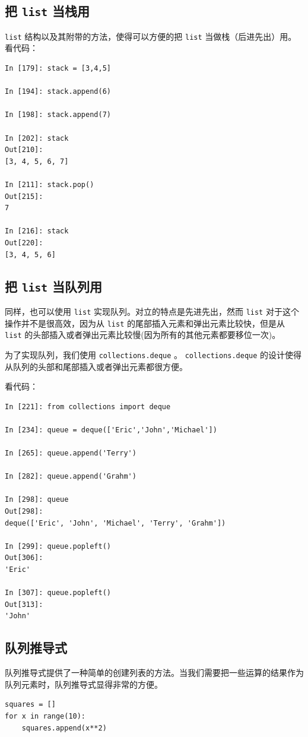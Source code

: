 \documentclass[10pt,a4paper,UTF8]{article}
\begin{document}
\subsection{把 \texttt{list} 当栈用}
\label{sec:org85c0c4e}


\texttt{list} 结构以及其附带的方法，使得可以方便的把 \texttt{list} 当做栈（后进先出）用。看代码：
\begin{verbatim}
In [179]: stack = [3,4,5]

In [194]: stack.append(6)

In [198]: stack.append(7)

In [202]: stack
Out[210]: 
[3, 4, 5, 6, 7]

In [211]: stack.pop()
Out[215]: 
7

In [216]: stack
Out[220]: 
[3, 4, 5, 6]
\end{verbatim}
\subsection{把 \texttt{list} 当队列用}
\label{sec:org37badd4}


同样，也可以使用 \texttt{list} 实现队列。对立的特点是先进先出，然而 \texttt{list} 对于这个操作并不是很高效，因为从 \texttt{list} 的尾部插入元素和弹出元素比较快，但是从 \texttt{list} 的头部插入或者弹出元素比较慢(因为所有的其他元素都要移位一次)。

为了实现队列，我们使用 \texttt{collections.deque} 。 \texttt{collections.deque} 的设计使得从队列的头部和尾部插入或者弹出元素都很方便。

看代码：
\begin{verbatim}
In [221]: from collections import deque

In [234]: queue = deque(['Eric','John','Michael'])

In [265]: queue.append('Terry')

In [282]: queue.append('Grahm')

In [298]: queue
Out[298]: 
deque(['Eric', 'John', 'Michael', 'Terry', 'Grahm'])

In [299]: queue.popleft()
Out[306]: 
'Eric'

In [307]: queue.popleft()
Out[313]: 
'John'
\end{verbatim}
\subsection{队列推导式}
\label{sec:orgeddcc9d}


队列推导式提供了一种简单的创建列表的方法。当我们需要把一些运算的结果作为队列元素时，队列推导式显得非常的方便。
\begin{verbatim}
squares = []
for x in range(10):
    squares.append(x**2)
\end{verbatim}
\end{document}
